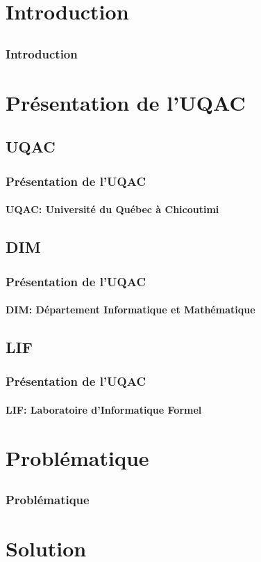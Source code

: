 \documentclass[11pt,compress]{beamer}
\begin{document}
\section{Introduction}
\subsection{}
\begin{frame}
\frametitle{Introduction}

\end{frame}

\section{Présentation de l'UQAC}
\subsection{UQAC}
\begin{frame}
\frametitle{Présentation de l'UQAC}
\framesubtitle{UQAC: Université du Québec à Chicoutimi}
\end{frame}
\subsection{DIM}
\begin{frame}
\frametitle{Présentation de l'UQAC}
\framesubtitle{DIM: Département Informatique et Mathématique}
\end{frame}
\subsection{LIF}
\begin{frame}
\frametitle{Présentation de l'UQAC}
\framesubtitle{LIF: Laboratoire d'Informatique Formel}
\end{frame}

\section{Problématique}
\subsection{}
\begin{frame}
\frametitle{Problématique}

\end{frame}

\section{Solution}
\end{document}
